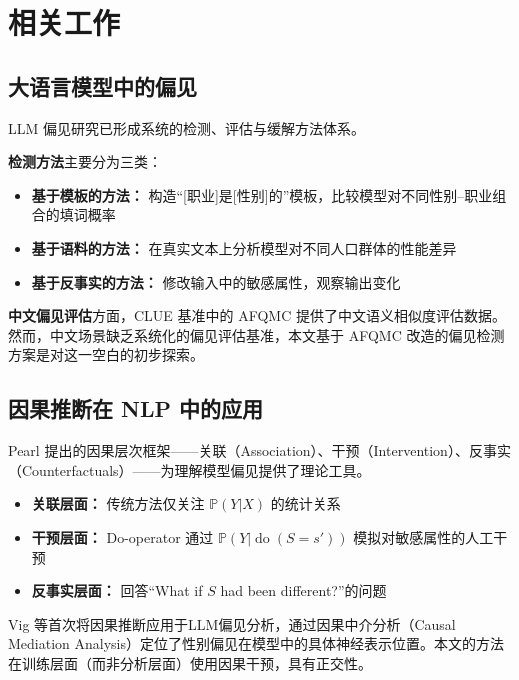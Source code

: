 \documentclass[12pt,a4paper,oneside]{ctexart}
\renewcommand{\P}{\mathbb{P}}
\newcommand{\doop}{\operatorname{do}}
\begin{document}
\section{相关工作}

\subsection{大语言模型中的偏见}

LLM 偏见研究已形成系统的检测、评估与缓解方法体系。

\textbf{检测方法}主要分为三类：
\begin{itemize}
  \item \textbf{基于模板的方法：} 构造``\mbox{[职业]}是\mbox{[性别]}的''模板，比较模型对不同性别--职业组合的填词概率\cite{bolukbasi2016,nadeem2021}
  \item \textbf{基于语料的方法：} 在真实文本上分析模型对不同人口群体的性能差异\cite{blodgett2020}
  \item \textbf{基于反事实的方法：} 修改输入中的敏感属性，观察输出变化\cite{garg2019}
\end{itemize}

\textbf{中文偏见评估}方面，CLUE 基准\cite{xu2020}中的 AFQMC 提供了中文语义相似度评估数据。然而，中文场景缺乏系统化的偏见评估基准，本文基于 AFQMC 改造的偏见检测方案是对这一空白的初步探索。

\subsection{因果推断在 NLP 中的应用}

Pearl\cite{pearl2009} 提出的因果层次框架——关联（Association）、干预（Intervention）、反事实（Counterfactuals）——为理解模型偏见提供了理论工具。

\begin{itemize}
  \item \textbf{关联层面：} 传统方法仅关注 $\P(Y|X)$ 的统计关系
  \item \textbf{干预层面：} Do-operator 通过 $\P(Y|\doop(S=s'))$ 模拟对敏感属性的人工干预
  \item \textbf{反事实层面：} 回答``What if $S$ had been different?''的问题
\end{itemize}

Vig 等\cite{vig2020}首次将因果推断应用于LLM偏见分析，通过因果中介分析（Causal Mediation Analysis）定位了性别偏见在模型中的具体神经表示位置。本文的方法在训练层面（而非分析层面）使用因果干预，具有正交性。
\end{document}
